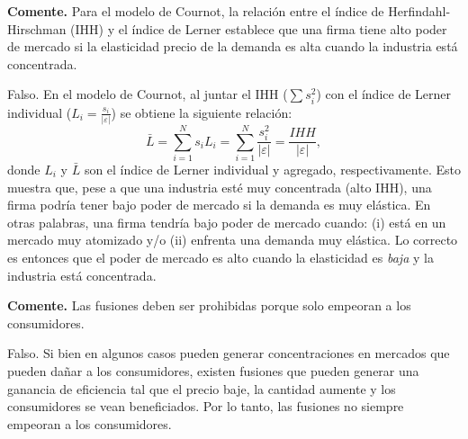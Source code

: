 \question \textbf{Comente.} Para el modelo de Cournot, la relación entre el índice de Herfindahl-Hirschman (IHH) y el índice de Lerner establece que una firma tiene alto poder de mercado si la elasticidad precio de la demanda es alta cuando la industria está concentrada.
\begin{solution}
Falso. En el modelo de Cournot, al juntar el IHH ($\sum s_i^2$) con el índice de Lerner individual ($L_i = \frac{s_i}{|\varepsilon|}$) se obtiene la siguiente relación:
\[
  \bar L = \sum_{i=1}^{N}s_i L_i = \sum_{i=1}^{N}\frac{s_i^2}{|\varepsilon|} = \frac{IHH}{|\varepsilon|},
\]
donde $L_i$ y $\bar L$ son el índice de Lerner individual y agregado, respectivamente. Esto muestra que, pese a que una industria esté muy concentrada (alto IHH), una firma podría tener bajo poder de mercado si la demanda es muy elástica. En otras palabras, una firma tendría bajo poder de mercado cuando: (i) está en un mercado muy atomizado y/o (ii) enfrenta una demanda muy elástica. Lo correcto es entonces que el poder de mercado es alto cuando la elasticidad es \emph{baja} y la industria está concentrada.

\end{solution}

\question \textbf{Comente.} Las fusiones deben ser prohibidas porque solo empeoran a los consumidores.
\begin{solution}
Falso. Si bien en algunos casos pueden generar concentraciones en mercados que pueden dañar a los consumidores, existen fusiones que pueden generar una ganancia de eficiencia tal que el precio baje, la cantidad aumente y los consumidores se vean beneficiados. Por lo tanto, las fusiones no siempre empeoran a los consumidores.

\end{solution}


